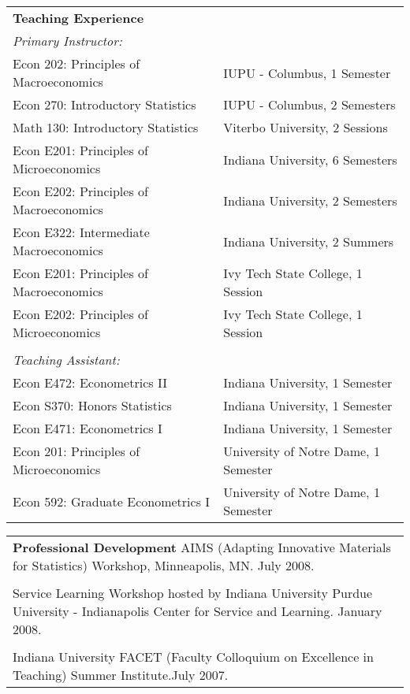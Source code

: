 \documentclass[12pt,notitlepage,oneside]{book}
\begin{document}
\begin{singlespace}
\begin{tabular}{p{3in}p{3in}}
\textbf{Teaching Experience} & \\
\emph{Primary Instructor:} & \\
Econ 202: Principles of Macroeconomics & IUPU - Columbus, 1 Semester \\
Econ 270: Introductory Statistics & IUPU - Columbus, 2 Semesters \\
Math 130: Introductory Statistics & Viterbo University, 2 Sessions \\
Econ E201: Principles of Microeconomics & Indiana University, 6 Semesters \\
Econ E202: Principles of Macroeconomics & Indiana University, 2 Semesters \\
Econ E322: Intermediate Macroeconomics & Indiana University, 2 Summers \\
Econ E201: Principles of Macroeconomics & Ivy Tech State College, 1 Session \\
Econ E202: Principles of Microeconomics & Ivy Tech State College, 1 Session \\ \\
\emph{Teaching Assistant:} & \\
Econ E472: Econometrics II & Indiana University, 1 Semester \\
Econ S370: Honors Statistics & Indiana University, 1 Semester \\
Econ E471: Econometrics I & Indiana University, 1 Semester \\
Econ 201: Principles of Microeconomics & University of Notre Dame, 1 Semester \\
Econ 592: Graduate Econometrics I & University of Notre Dame, 1 Semester \\
\end{tabular} 
\newpage

\thispagestyle{empty}
\begin{tabular}{p{5.5in}}
\textbf{Professional Development} \newline
AIMS (Adapting Innovative Materials for Statistics) Workshop, Minneapolis, MN.  July 2008.\\\\
Service Learning Workshop hosted by Indiana University Purdue University - Indianapolis Center for Service and Learning.  January 2008.\\\\
Indiana University FACET (Faculty Colloquium on Excellence in Teaching) Summer Institute.\newline July 2007.
\end{tabular} \\ \\


\end{singlespace}
\end{document}
